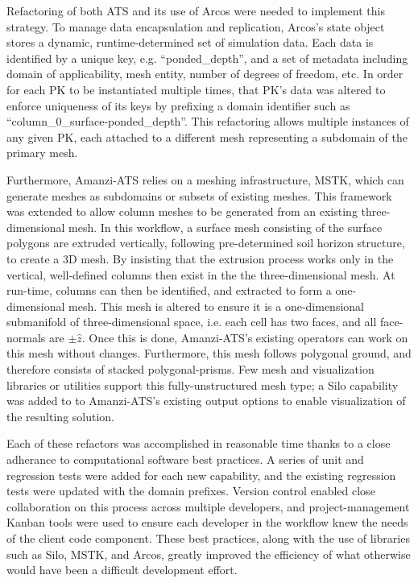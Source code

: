 \documentclass[review,11pt]{elsarticle}
\begin{document}
Refactoring of both ATS and its use of Arcos were needed to implement this strategy.
To manage data encapsulation and replication, Arcos's state object stores a dynamic, runtime-determined set of simulation data.
Each data is identified by a unique key, e.g. ``ponded\_depth'', and a set of metadata including domain of applicability, mesh entity, number of degrees of freedom, etc.
In order for each PK to be instantiated multiple times, that PK's data was altered to enforce uniqueness of its keys by prefixing a domain identifier such as ``column\_0\_surface-ponded\_depth''.
This refactoring allows multiple instances of any given PK, each attached to a different mesh representing a subdomain of the primary mesh.

Furthermore, Amanzi-ATS relies on a meshing infrastructure, MSTK, \cite{garimella-2014-mstk}  which can generate meshes as subdomains or subsets of existing meshes.
This framework was extended to allow column meshes to be generated from an existing three-dimensional mesh.
In this workflow, a surface mesh consisting of the surface polygons are extruded vertically, following pre-determined soil horizon structure, to create a 3D mesh.
By insisting that the extrusion process works only in the vertical, well-defined columns then exist in the the three-dimensional mesh.
At run-time, columns can then be identified, and extracted to form a one-dimensional mesh.
This mesh is altered to ensure it is a one-dimensional submanifold of three-dimensional space, i.e. each cell has two faces, and all face-normals are $\pm \hat{z}$.
Once this is done, Amanzi-ATS's existing operators can work on this mesh without changes.
Furthermore, this mesh follows polygonal ground, and therefore consists of stacked polygonal-prisms.
Few mesh and visualization libraries or utilities support this fully-unstructured mesh type; a Silo\cite{silo} capability was added to to Amanzi-ATS's existing output options to enable visualization of the resulting solution.

Each of these refactors was accomplished in reasonable time thanks to a close adherance to computational software best practices.
A series of unit and regression tests were added for each new capability, and the existing regression tests were updated with the domain prefixes.
Version control enabled close collaboration on this process across multiple developers, and project-management Kanban tools were used to ensure each developer in the workflow knew the needs of the client code component.
These best practices, along with the use of libraries such as Silo, MSTK, and Arcos, greatly improved the efficiency of what otherwise would have been a difficult development effort.
\end{document}
